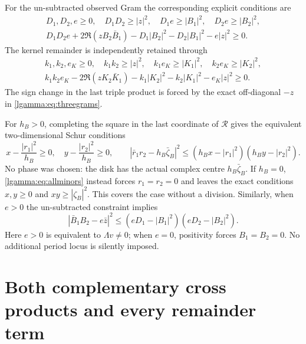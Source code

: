 For the un-subtracted observed Gram the corresponding explicit conditions
are
\begin{equation}\label{lgamma:eq:observedminors}
 \begin{gathered}
 D_1,D_2,e\ge0,\quad D_1D_2\ge|z|^2,\quad
 D_1e\ge|B_1|^2,\quad D_2e\ge|B_2|^2,\\
 D_1D_2e+2\Re(zB_2\bar B_1)
 -D_1|B_2|^2-D_2|B_1|^2-e|z|^2\ge0.
 \end{gathered}
\end{equation}
The kernel remainder is independently retained through
\begin{equation}\label{lgamma:eq:kernelminors}
 \begin{gathered}
 k_1,k_2,e_K\ge0,\quad k_1k_2\ge|z|^2,\quad
 k_1e_K\ge|K_1|^2,\quad k_2e_K\ge|K_2|^2,\\
 k_1k_2e_K-2\Re(zK_2\bar K_1)
 -k_1|K_2|^2-k_2|K_1|^2-e_K|z|^2\ge0.
 \end{gathered}
\end{equation}
The sign change in the last triple product is forced by the exact
off-diagonal $-z$ in \eqref{lgamma:eq:threegrams}.

For $h_B>0$, completing the square in the last coordinate of
$\mathcal R$ gives the equivalent two-dimensional Schur conditions
\begin{equation}\label{lgamma:eq:resdisk}
 x-\frac{|r_1|^2}{h_B}\ge0,\quad
 y-\frac{|r_2|^2}{h_B}\ge0,\qquad
 \left|\bar r_1r_2-h_B\bar\zeta_B\right|^2
 \le(h_Bx-|r_1|^2)(h_By-|r_2|^2).
\end{equation}
No phase was chosen: the disk has the actual complex centre
$h_B\bar\zeta_B$.  If $h_B=0$, \eqref{lgamma:eq:allminors} instead forces
$r_1=r_2=0$ and leaves the exact conditions $x,y\ge0$ and
$xy\ge|\zeta_B|^2$.  This covers the case without a division.
Similarly, when $e>0$ the un-subtracted constraint implies
\begin{equation}\label{lgamma:eq:Bdisk}
 |\bar B_1B_2-e\bar z|^2
 \le(eD_1-|B_1|^2)(eD_2-|B_2|^2).
\end{equation}
Here $e>0$ is equivalent to $\Lambda v\ne0$; when $e=0$, positivity
forces $B_1=B_2=0$.  No additional period locus is silently imposed.

\section{Both complementary cross products and every remainder term}


